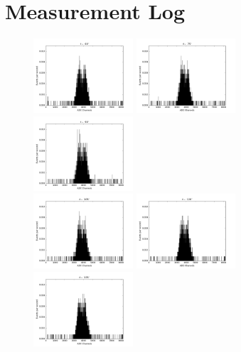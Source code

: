 \documentclass[a4paper,parskip,11pt, DIV12]{scrreprt}
\begin{document}
\section{Measurement Log}\label{app:histogramraw}
%
\begin{figure}[H]
\centering
\includegraphics[width=0.33\textwidth]{60degraw.png}\hfill
\includegraphics[width=0.33\textwidth]{75degraw.png}\hfill
\includegraphics[width=0.33\textwidth]{90degraw.png}\\
\includegraphics[width=0.33\textwidth]{105degraw.png}\hfill
\includegraphics[width=0.33\textwidth]{120degraw.png}\hfill
\includegraphics[width=0.33\textwidth]{135degraw.png}\\

\end{figure}
\end{document}
